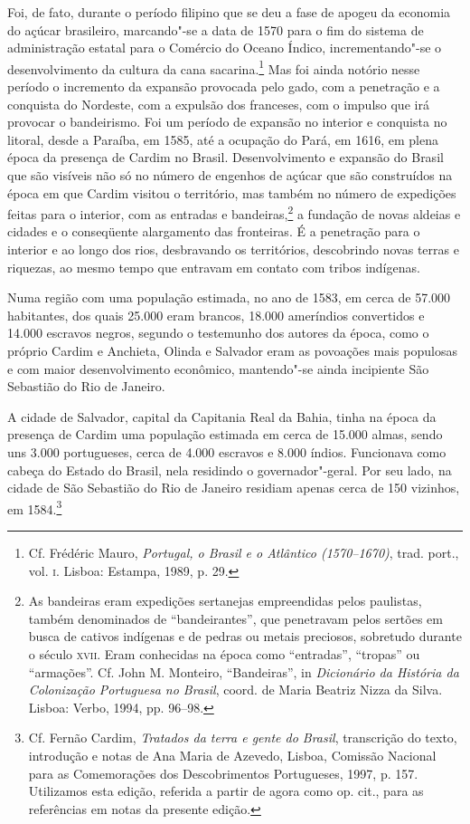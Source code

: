 Foi, de fato, durante o período filipino que se deu a fase de
apogeu da economia do açúcar brasileiro, marcando"-se a data de 1570
para o fim do sistema de administração estatal para o Comércio do
Oceano Índico, incrementando"-se o desenvolvimento da cultura da cana
sacarina.\footnote{ Cf. Frédéric Mauro, \textit{Portugal, o
Brasil e o Atlântico (1570--1670)}, trad. port., vol. \textsc{i}. Lisboa:
Estampa, 1989, p. 29.} Mas foi ainda notório nesse período o
incremento da expansão provocada pelo gado, com a penetração e a
conquista do Nordeste, com a expulsão dos franceses, com o impulso que
irá provocar o bandeirismo. Foi um período de expansão no interior e
conquista no litoral, desde a Paraíba, em 1585, até a ocupação do Pará,
em 1616, em plena época da presença de Cardim no Brasil. 
Desenvolvimento e expansão do Brasil que são visíveis não só no número
de engenhos de açúcar que são construídos na época em que Cardim
visitou o território, mas também no número de expedições feitas para o
interior, com as entradas e bandeiras,\footnote{ As bandeiras eram
expedições sertanejas empreendidas pelos paulistas, também denominados
de ``bandeirantes'', que penetravam pelos sertões em busca de cativos
indígenas e de pedras ou metais preciosos, sobretudo durante o século
\textsc{xvii}. Eram conhecidas na época como ``entradas'', ``tropas'' ou ``armações''.
Cf. John M. Monteiro, ``Bandeiras'', in \textit{Dicionário da História
da Colonização Portuguesa no Brasil}, coord. de Maria Beatriz Nizza da
Silva. Lisboa: Verbo, 1994, pp. 96--98.} a fundação de novas aldeias e
cidades e o conseqüente alargamento das fronteiras. É a penetração para
o interior e ao longo dos rios, desbravando os territórios, descobrindo
novas terras e riquezas, ao mesmo tempo que entravam em contato com tribos indígenas. 

Numa região com uma população estimada, no ano de 1583, em cerca de
57.000 habitantes, dos quais 25.000 eram brancos, 18.000 ameríndios
convertidos e 14.000 escravos negros, segundo o testemunho dos autores
da época, como o próprio Cardim e Anchieta, Olinda e Salvador eram as
povoações mais populosas e com maior desenvolvimento econômico,
mantendo"-se ainda incipiente São Sebastião do Rio de Janeiro.

A cidade de Salvador, capital da Capitania Real da Bahia, tinha na
época da presença de Cardim uma população estimada em cerca de 15.000
almas, sendo uns 3.000 portugueses, cerca de 4.000 escravos e 8.000
índios. Funcionava como cabeça do Estado do Brasil, nela residindo o
governador"-geral. Por seu lado, na cidade de São Sebastião do Rio de
Janeiro residiam apenas cerca de 150 vizinhos, em 1584.\footnote{ Cf. Fernão Cardim, 
\textit{Tratados da terra e gente do Brasil}, transcrição do texto, introdução e notas de 
Ana Maria de Azevedo, Lisboa, Comissão Nacional para as Comemorações dos Descobrimentos Portugueses, 
1997, p. 157. Utilizamos esta edição, referida a partir de agora como op. cit., 
para as referências em notas da presente edição.}


